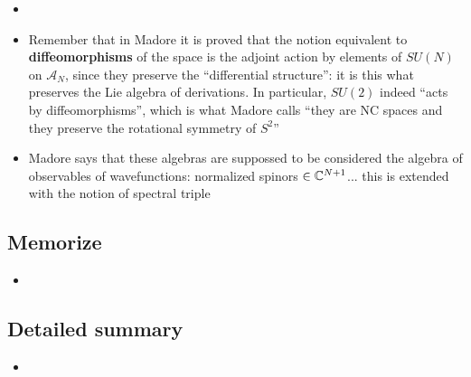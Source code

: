 \documentclass{article}
\begin{document}
\begin{itemize}
\begin{itemize}
        \end{itemize}
    
    \item {}
    
    \item Remember that in Madore it is proved that the notion equivalent to \textbf{diffeomorphisms} of the space is the adjoint action by elements of $SU(N)$ on $\mathcal A_N$, since they preserve the ``differential structure'': it is this what preserves the Lie algebra of derivations. In particular, $SU(2)$ indeed ``acts by diffeomorphisms'', which is what Madore calls ``they are NC spaces and they preserve the rotational symmetry of $S^2$''
    
    \item Madore says that these algebras are suppossed to be considered the algebra of observables of wavefunctions: normalized spinors $\in \mathbb{C}^{N+1}$... this is extended with the notion of spectral triple
    
    \end{itemize}

\subsection{Memorize}

    \begin{itemize}

    \item 
    
    \end{itemize}

\subsection{Detailed summary}

    \begin{itemize}

    \item 
    
    \end{itemize}

\end{document}
